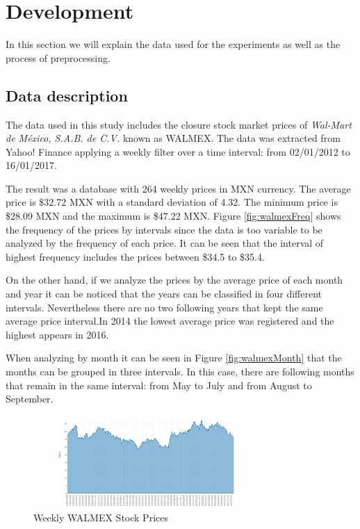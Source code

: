 \chapter{Development}
\label{ch:dev}

In this section we will explain the data used for the experiments as well as the process of preprocessing.

\section{Data description}
The data used in this study includes the closure stock market prices of \textit{Wal-Mart de México, S.A.B. de C.V.} known as WALMEX. The data was extracted from Yahoo! Finance applying a weekly filter over a time interval: from 02/01/2012 to 16/01/2017.

The result was a database with 264 weekly prices in MXN currency. The average price is \$32.72 MXN with a standard deviation of 4.32. The minimum price is \$28.09 MXN and the maximum is \$47.22 MXN. Figure \ref{fig:walmexFreq} shows the frequency of the prices by intervals since the data is too variable to be analyzed by the frequency of each price. It can be seen that the interval of highest frequency includes the prices between \$34.5 to \$35.4. 

On the other hand, if we analyze the prices by the average price of each month and year it can be noticed that the years can be classified in four different intervals. Nevertheless there are no two following years that kept the same average price interval.In 2014 the lowest average price was registered and the highest appears in 2016.

When analyzing by month it can be seen in Figure \ref{fig:walmexMonth} that the months can be grouped in three intervals. In this case, there are following months that remain in the same interval: from May to July and from August to September. 

 
\begin{figure}
\center
\includegraphics[width=8.5cm,height=3.5cm]{Figures/wamexCompleto.PNG}
\caption{Weekly WALMEX Stock Prices}
\label{fig:walmexComp}
\end{figure}

